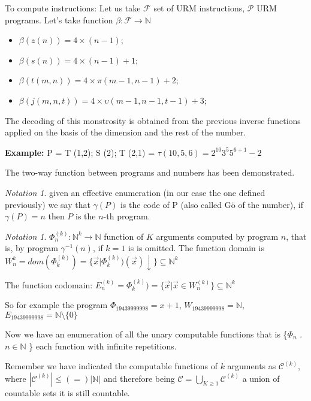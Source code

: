 \documentclass{amsbook}
\newcommand{\nat}{\ensuremath{\mathbb{N}}}
\theoremstyle{definition}
\theoremstyle{remark}
\newtheorem{notation}[theorem]{Notation}
\numberwithin{section}{chapter}
\numberwithin{equation}{chapter}
\begin{document}
To compute instructions: Let us take $ \mathcal{F} $ set of URM instructions, $ \mathcal{P} $ URM programs. Let's take function $ \beta:\mathcal{F}\rightarrow\nat $
\begin{itemize}
	\item $ \beta(z(n)) = 4 \times (n-1) $;
	\item $ \beta(s(n)) = 4 \times (n-1)+1 $;
	\item $ \beta(t(m,n)) = 4 \times \pi(m-1,n-1)+2 $;
	\item $ \beta(j(m,n,t)) = 4 \times \upsilon(m-1,n-1,t-1)+3 $;
\end{itemize}

The decoding of this monstrosity is obtained from the previous inverse functions applied on the basis of the dimension and the rest of the number.

\textbf{Example:} P = T (1,2); S (2); T (2,1) = $ \tau(10,5,6) = 2^{10} 3^5 5^{6+1} -2 $

The two-way function between programs and numbers has been demonstrated.

\begin{notation} given an effective enumeration (in our case the one defined previously) we say that $ \gamma(P) $ is the code of P (also called G\"{o} of the number), if $ \gamma(P) = n $ then $P$ is the $n$-th program.
\end{notation}

\begin{notation} $ \Phi_n^{(k)}: \nat^k\rightarrow\nat $ function of $K$ arguments computed by program $n$, that is, by program $ \gamma^{-1}(n) $, if $k = 1$ is is omitted. The function domain  is $ W_n^{k} = dom(\Phi_k^{(k)}) = \{\vec{x} | \Phi_k^{(k)})(\vec{x})\downarrow  \} \subseteq \nat^k$

The function codomain: $ E^{(k)}_n = \Phi_k^{(k)}) = \{\vec{x} | \vec{x} \in W_n^{(k)} \} \subseteq \nat^k$
\end{notation}

So for example the program $ \Phi_{19439999998} = x+1 $, $ W_{19439999998} = \nat $, $ E_{19439999998} = \nat \setminus \{0\} $

Now we have an enumeration of all the unary computable functions that is \{$ \Phi_n $ . $ n \in \nat $ \} each function with infinite repetitions.

Remember we have indicated the computable functions of $k$ arguments as $ \mathcal{C} ^ {(k)} $, where $ | \mathcal{C} ^ {(k)} | \leq (=) | \nat | $ and therefore being $ \mathcal{C} = \bigcup_{K \geq 1} \mathcal{C} ^ {(k)} $ a union of countable sets it is still countable.
\end{document}
